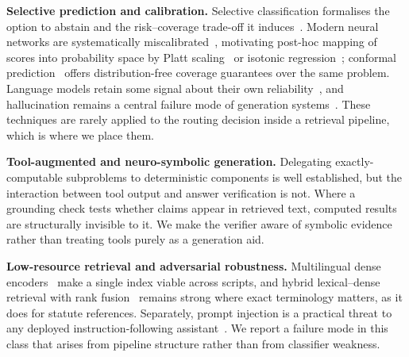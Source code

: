 \documentclass[conference]{IEEEtran}
\begin{document}
\textbf{Selective prediction and calibration.}
Selective classification formalises the option to abstain and the
risk--coverage trade-off it induces~\cite{elyaniv2010selective,
geifman2017selectivenet}. Modern neural networks are systematically
miscalibrated~\cite{guo2017calibration}, motivating post-hoc mapping of scores
into probability space by Platt scaling~\cite{platt1999} or isotonic
regression~\cite{zadrozny2002isotonic}; conformal
prediction~\cite{angelopoulos2021conformal} offers distribution-free coverage
guarantees over the same problem. Language models retain some signal about
their own reliability~\cite{kadavath2022know}, and hallucination remains a
central failure mode of generation systems~\cite{ji2023hallucination}. These
techniques are rarely applied to the routing decision inside a retrieval
pipeline, which is where we place them.

\textbf{Tool-augmented and neuro-symbolic generation.}
Delegating exactly-computable subproblems to deterministic components is
well established, but the interaction between tool output and answer
verification is not. Where a grounding check tests whether claims appear in
retrieved text, computed results are structurally invisible to it. We make the
verifier aware of symbolic evidence rather than treating tools purely as a
generation aid.

\textbf{Low-resource retrieval and adversarial robustness.}
Multilingual dense encoders~\cite{wang2024multilinguale5} make a single index
viable across scripts, and hybrid lexical--dense retrieval with rank
fusion~\cite{robertson2009bm25,cormack2009rrf} remains strong where exact
terminology matters, as it does for statute references. Separately, prompt
injection is a practical threat to any deployed instruction-following
assistant~\cite{perez2022ignore,greshake2023injection}. We report a failure mode
in this class that arises from pipeline structure rather than from classifier
weakness.
\end{document}
